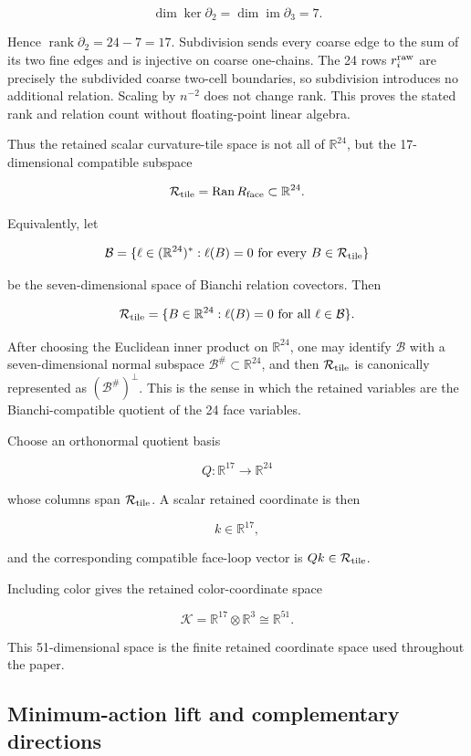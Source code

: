 \documentclass[10pt]{article}
\begin{document}
\[
\dim\ker\partial_2=\dim\operatorname{im}\partial_3=7.
\]

Hence \(\operatorname{rank}\partial_2=24-7=17\).  Subdivision sends every coarse edge to the sum of its two fine edges and is injective on coarse one-chains.  The 24 rows \(r_i^{\rm raw}\) are precisely the subdivided coarse two-cell boundaries, so subdivision introduces no additional relation.  Scaling by \(n^{-2}\) does not change rank.  This proves the stated rank and relation count without floating-point linear algebra.

Thus the retained scalar curvature-tile space is not all of \(\mathbb R^{24}\), but the 17-dimensional compatible subspace

\[
\mathcal R_{\rm tile}
=
\operatorname{Ran}R_{\rm face}
\subset
\mathbb R^{24}.
\]

Equivalently, let

\[
\mathcal B
=
\{\ell\in(\mathbb R^{24})^\ast:\ell(B)=0
\text{ for every }B\in\mathcal R_{\rm tile}\}
\]

be the seven-dimensional space of Bianchi relation covectors.  Then

\[
\mathcal R_{\rm tile}
=
\{B\in\mathbb R^{24}:\ell(B)=0\text{ for all }\ell\in\mathcal B\}.
\]

After choosing the Euclidean inner product on \(\mathbb R^{24}\), one may identify \(\mathcal B\) with a seven-dimensional normal subspace \(\mathcal B^\#\subset\mathbb R^{24}\), and then \(\mathcal R_{\rm tile}\) is canonically represented as \((\mathcal B^\#)^\perp\).  This is the sense in which the retained variables are the Bianchi-compatible quotient of the 24 face variables.

Choose an orthonormal quotient basis

\[
Q:\mathbb R^{17}\longrightarrow \mathbb R^{24}
\]

whose columns span \(\mathcal R_{\rm tile}\).  A scalar retained coordinate is then

\[
k\in\mathbb R^{17},
\]

and the corresponding compatible face-loop vector is \(Qk\in\mathcal R_{\rm tile}\).

Including color gives the retained color-coordinate space

\[
\mathcal K
=
\mathbb R^{17}\otimes\mathbb R^3
\cong
\mathbb R^{51}.
\]

This 51-dimensional space is the finite retained coordinate space used throughout the paper.

\subsection{Minimum-action lift and complementary directions}
\end{document}
